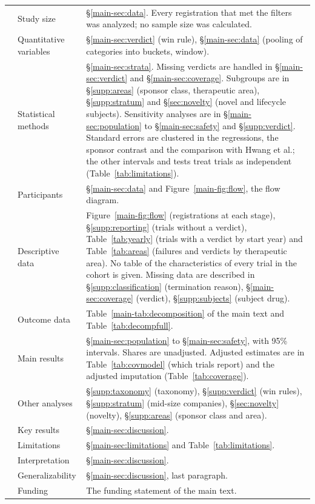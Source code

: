 \documentclass[11pt]{article}
\newcounter{strobe}
\newcommand{\strobeitem}{\stepcounter{strobe}\arabic{strobe}}
\begin{document}
\begin{table}[H]
\begin{tabular}{r>{\raggedright\arraybackslash}p{}>{\raggedright\arraybackslash}p{}}
\strobeitem & Study size & \S\ref{main-sec:data}. Every registration that met the filters was analyzed; no sample size was calculated. \\
\strobeitem & Quantitative variables & \S\ref{main-sec:verdict} (win rule), \S\ref{main-sec:data} (pooling of categories into buckets, window). \\
\strobeitem & Statistical methods & \S\ref{main-sec:strata}. Missing verdicts are handled in \S\ref{main-sec:verdict} and \S\ref{main-sec:coverage}. Subgroups are in \S\ref{supp:areas} (sponsor class, therapeutic area), \S\ref{supp:stratum} and \S\ref{sec:novelty} (novel and lifecycle subjects). Sensitivity analyses are in \S\ref{main-sec:population} to \S\ref{main-sec:safety} and \S\ref{supp:verdict}. Standard errors are clustered in the regressions, the sponsor contrast and the comparison with Hwang et al.; the other intervals and tests treat trials as independent (Table~\ref{tab:limitations}). \\
\strobeitem & Participants & \S\ref{main-sec:data} and Figure~\ref{main-fig:flow}, the flow diagram. \\
\strobeitem & Descriptive data & Figure~\ref{main-fig:flow} (registrations at each stage), \S\ref{supp:reporting} (trials without a verdict), Table~\ref{tab:yearly} (trials with a verdict by start year) and Table~\ref{tab:areas} (failures and verdicts by therapeutic area). No table of the characteristics of every trial in the cohort is given. Missing data are described in \S\ref{supp:classification} (termination reason), \S\ref{main-sec:coverage} (verdict), \S\ref{supp:subjects} (subject drug). \\
\strobeitem & Outcome data & Table~\ref{main-tab:decomposition} of the main text and Table~\ref{tab:decompfull}. \\
\strobeitem & Main results & \S\ref{main-sec:population} to \S\ref{main-sec:safety}, with 95\% intervals. Shares are unadjusted. Adjusted estimates are in Table~\ref{tab:covmodel} (which trials report) and the adjusted imputation (Table~\ref{tab:coverage}). \\
\strobeitem & Other analyses & \S\ref{supp:taxonomy} (taxonomy), \S\ref{supp:verdict} (win rules), \S\ref{supp:stratum} (mid-size companies), \S\ref{sec:novelty} (novelty), \S\ref{supp:areas} (sponsor class and area). \\
\strobeitem & Key results & \S\ref{main-sec:discussion}. \\
\strobeitem & Limitations & \S\ref{main-sec:limitations} and Table~\ref{tab:limitations}. \\
\strobeitem & Interpretation & \S\ref{main-sec:discussion}. \\
\strobeitem & Generalizability & \S\ref{main-sec:discussion}, last paragraph. \\
\strobeitem & Funding & The funding statement of the main text. \\
\bottomrule
\end{tabular}
\end{table}
\end{document}
